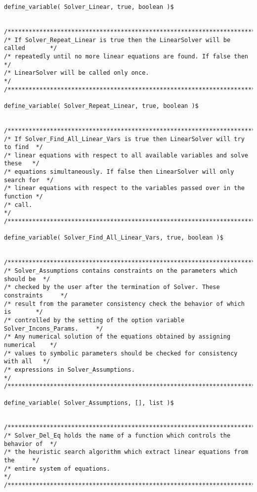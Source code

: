 \begin{verbatim}
define_variable( Solver_Linear, true, boolean )$


/******************************************************************************/
/* If Solver_Repeat_Linear is true then the LinearSolver will be called       */
/* repeatedly until no more linear equations are found. If false then         */
/* LinearSolver will be called only once.                                     */
/******************************************************************************/

define_variable( Solver_Repeat_Linear, true, boolean )$


/******************************************************************************/
/* If Solver_Find_All_Linear_Vars is true then LinearSolver will try to find  */
/* linear equations with respect to all available variables and solve these   */
/* equations simultaneously. If false then LinearSolver will only search for  */
/* linear equations with respect to the variables passed over in the function */
/* call.                                                                      */
/******************************************************************************/

define_variable( Solver_Find_All_Linear_Vars, true, boolean )$


/******************************************************************************/
/* Solver_Assumptions contains constraints on the parameters which should be  */
/* checked by the user after the termination of Solver. These constraints     */
/* result from the parameter consistency check the behavior of which is       */
/* controlled by the setting of the option variable Solver_Incons_Params.     */
/* Any numerical solution of the equations obtained by assigning numerical    */
/* values to symbolic parameters should be checked for consistency with all   */
/* expressions in Solver_Assumptions.                                         */
/******************************************************************************/

define_variable( Solver_Assumptions, [], list )$


/******************************************************************************/
/* Solver_Del_Eq holds the name of a function which controls the behavior of  */
/* the heuristic search algorithm which extract linear equations from the     */
/* entire system of equations.                                                */
/******************************************************************************/


\end{verbatim}
